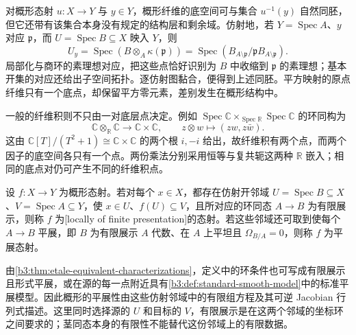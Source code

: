 对概形态射 \(u:X\to Y\) 与 \(y\in Y\)，概形纤维的底空间可与集合 \(u^{-1}(y)\) 自然同胚，但它还带有该集合本身没有规定的结构层和剩余域。仿射地，若 \(Y=\operatorname{Spec}A\)、\(y\) 对应 \(\mathfrak p\)，而 \(U=\operatorname{Spec}B\subseteq X\) 映入 \(Y\)，则
\[
	U_y=\operatorname{Spec}(B\otimes_A\kappa(\mathfrak p)) =\operatorname{Spec}(B_{A\setminus\mathfrak p}/\mathfrak pB_{A\setminus\mathfrak p}).
\]
局部化与商环的素理想对应，把这些点恰好识别为 \(B\) 中收缩到 \(\mathfrak p\) 的素理想；基本开集的对应还给出子空间拓扑。逐仿射图黏合，便得到上述同胚。平方映射的原点纤维只有一个底点，却保留平方零元素，差别发生在概形结构中。

\ProseParagraphBreak
一般的纤维积则不只由一对底层点决定。例如 \(\operatorname{Spec}\mathbb C\times_{\operatorname{Spec}\mathbb R}\operatorname{Spec}\mathbb C\) 的环同构为
\[
	\mathbb C\otimes_{\mathbb R}\mathbb C\longrightarrow\mathbb C\times\mathbb C, \qquad z\otimes w\longmapsto(zw,z\bar w).
\]
这由 \(\mathbb C[T]/(T^2+1)\cong\mathbb C\times\mathbb C\) 的两个根 \(i,-i\) 给出，故纤维积有两个点，而两个因子的底空间各只有一个点。两份乘法分别采用恒等与复共轭这两种 \(\mathbb R\) 嵌入；相同的底点对仍可产生不同的纤维积点。

\begin{definition}\label{b3:def:etale-scheme-morphism}
	设 \(f:X\rightarrow Y\) 为概形态射。若对每个 \(x\in X\)，都存在仿射开邻域 \(U=\operatorname{Spec}B\subseteq X\)、\(V=\operatorname{Spec}A\subseteq Y\)，使 \(x\in U\)、\(f(U)\subseteq V\)，且所对应的环同态 \(A\rightarrow B\) 为有限展示，则称 \(f\) 为[locally of finite presentation]的态射。若这些邻域还可取到使每个 \(A\rightarrow B\) 平展，即 \(B\) 为有限展示 \(A\) 代数、在 \(A\) 上平坦且 \(\Omega_{B/A}=0\)，则称 \(f\) 为平展态射。
\end{definition}

由\cref{b3:thm:etale-equivalent-characterizations}，定义中的环条件也可写成有限展示且形式平展，或在源的每一点附近具有\cref{b3:def:standard-smooth-model}中的标准平展模型。因此概形的平展性由这些仿射邻域中的有限组方程及其可逆 Jacobian 行列式描述。这里同时选择源的 \(U\) 和目标的 \(V\)，有限展示是在这两个邻域的坐标环之间要求的；茎同态本身的有限性不能替代这份邻域上的有限数据。

